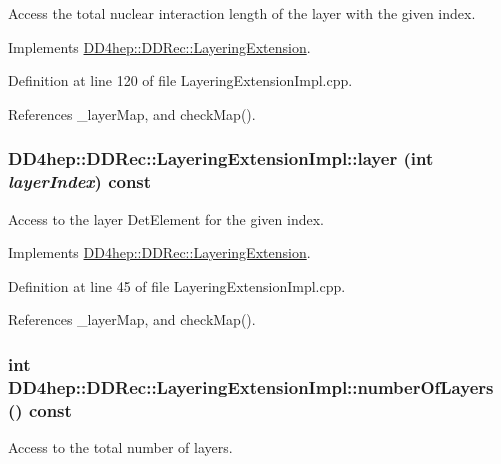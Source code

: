 Access the total nuclear interaction length of the layer with the given index. 

Implements \hyperlink{class_d_d4hep_1_1_d_d_rec_1_1_layering_extension_aa7959c9c384c0f5ffcd066c5dc01514f}{DD4hep::DDRec::LayeringExtension}.

Definition at line 120 of file LayeringExtensionImpl.cpp.

References \_\-layerMap, and checkMap().\hypertarget{class_d_d4hep_1_1_d_d_rec_1_1_layering_extension_impl_a2c672b63b63396c9751044089a13eea3}{
\subsubsection[{layer}]{ DD4hep::DDRec::LayeringExtensionImpl::layer (int {\em layerIndex}) const}}
\label{class_d_d4hep_1_1_d_d_rec_1_1_layering_extension_impl_a2c672b63b63396c9751044089a13eea3}


Access to the layer DetElement for the given index. 

Implements \hyperlink{class_d_d4hep_1_1_d_d_rec_1_1_layering_extension_a080be80c3277feaa59828b829d29c747}{DD4hep::DDRec::LayeringExtension}.

Definition at line 45 of file LayeringExtensionImpl.cpp.

References \_\-layerMap, and checkMap().\hypertarget{class_d_d4hep_1_1_d_d_rec_1_1_layering_extension_impl_a531a938c96eb801d0aa9bc540fd7ae1d}{
\subsubsection[{numberOfLayers}]{\setlength{\rightskip}{0pt plus 5cm}int DD4hep::DDRec::LayeringExtensionImpl::numberOfLayers () const}}
\label{class_d_d4hep_1_1_d_d_rec_1_1_layering_extension_impl_a531a938c96eb801d0aa9bc540fd7ae1d}


Access to the total number of layers. 

